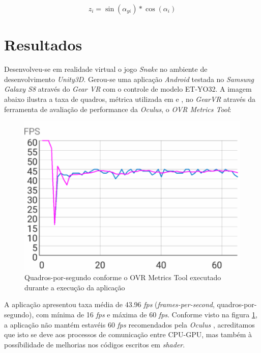 \documentclass{SBCbookchapter}
\begin{document}
\begin{equation}
z_{i} = \sin(\alpha_{yi}) * \cos(\alpha_i)
\label{equation4}
\end{equation}

\section{Resultados} \label{sec:results}
Desenvolveu-se em realidade virtual o jogo \textit{Snake} no ambiente de desenvolvimento \textit{Unity3D}. Gerou-se uma aplicação \textit{Android} testada no \textit{Samsung Galaxy S8} através do \textit{Gear VR} com o controle de modelo ET-YO32. A imagem abaixo ilustra a taxa de quadros, métrica utilizada em \cite{GPGPUWars} e \cite{GPGPUTechniques}, no \textit{GearVR} através da ferramenta de avaliação de performance da \textit{Oculus}, o \textit{OVR Metrics Tool}:

\begin{figure}[H]
\centering
\includegraphics[scale=0.5]{../../images/VRPerformance}
\caption{Quadros-por-segundo conforme o OVR Metrics Tool executado durante a execução da aplicação} \label{fig:VRPerformance}
\end{figure}

A aplicação apresentou taxa média de 43.96 \textit{fps} (\textit{frames-per-second}, quadros-por-segundo), com mínima de 16 \textit{fps} e máxima de 60 \textit{fps}. Conforme visto na figura \ref{fig:VRPerformance}, a aplicação não mantém estavéis 60 \textit{fps} recomendados pela \textit{Oculus} \cite{OculusVRGuidelines}, acreditamos que isto se deve aos processos de comunicação entre CPU-GPU, mas também à possíbilidade de melhorias nos códigos escritos em \textit{shader}.
\end{document}
